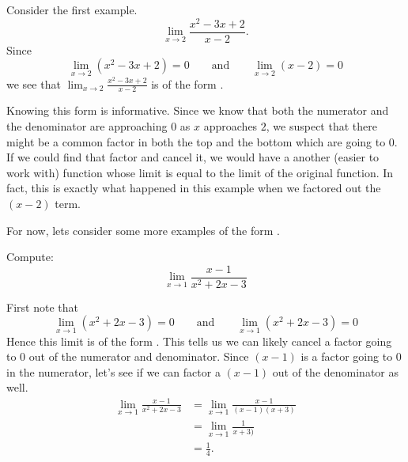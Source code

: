 \documentclass{ximera}
\begin{document}
Consider the first example.
\[
\lim_{x\to 2}\frac{x^2-3x+2}{x-2}.
\]
Since
\[
\lim_{x\to 2}\left(x^2-3x+2\right) = 0\qquad\text{and}\qquad \lim_{x\to
  2}\left(x-2\right) = 0
\]
we see that $\lim_{x\to 2}\frac{x^2-3x+2}{x-2}$ is of the form
\zeroOverZero.

Knowing this form is informative.  Since we know that both the
numerator and the denominator are approaching $0$ as $x$ approaches
$2$, we suspect that there might be a common factor in both the top
and the bottom which are going to $0$.  If we could find that factor
and cancel it, we would have a another (easier to work with) function
whose limit is equal to the limit of the original function.  In fact,
this is exactly what happened in this example when we factored out the
$(x-2)$ term.

For now, lets consider some more examples of the form \zeroOverZero.

\begin{example}
  Compute:
  \[
  \lim_{x\to1}\frac{x-1}{x^2+2x-3}
  \]
  \begin{explanation}
    First note that
    \[
    \lim_{x\to1}\left(x^2+2x-3\right)=0 \qquad\text{and}\qquad  \lim_{x\to1}\left(x^2+2x-3\right) = 0
    \]
    Hence this limit is of the form \zeroOverZero.  This tells us we
    can likely cancel a factor going to $0$ out of the numerator and
    denominator.  Since $(x-1)$ is a factor going to $0$ in the
    numerator, let's see if we can factor a $(x-1)$ out of the
    denominator as well.
    \begin{align*}
      \lim_{x\to1}\frac{x-1}{x^2+2x-3}&=\lim_{x\to1}\frac{x-1}{(x-1)(x+3)} \\
      &=\lim_{x\to1}\frac{1}{x+3)}\\
      &=\frac{1}{4}.
    \end{align*}
  \end{explanation}
\end{example}
\end{document}
